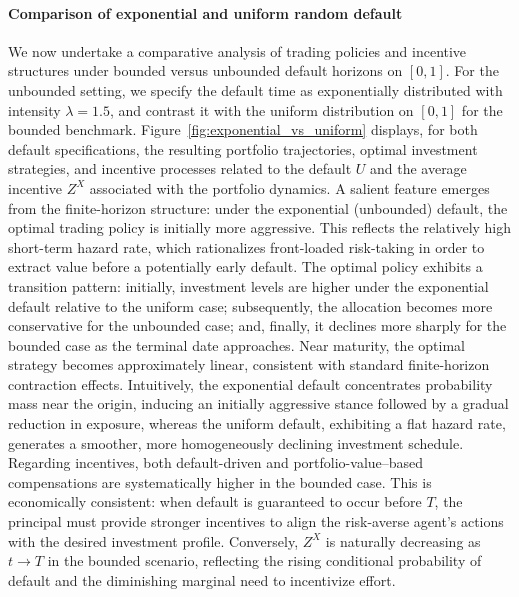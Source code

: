 \documentclass[11pt,a4paper]{article}
\theoremstyle{thmstyleone}%
\theoremstyle{thmstyletwo}%
\theoremstyle{thmstylethree}%
\begin{document}
\paragraph{Comparison of exponential and uniform random default} We now undertake a comparative analysis of trading policies and incentive structures under bounded versus unbounded default horizons on $[0,1]$. For the unbounded setting, we specify the default time as exponentially distributed with intensity $\lambda = 1.5$, and contrast it with the uniform distribution on $[0,1]$ for the bounded benchmark. Figure~\ref{fig:exponential_vs_uniform} displays, for both default specifications, the resulting portfolio trajectories, optimal investment strategies, and incentive processes related to the default $U$ and the average incentive $Z^X$ associated with the portfolio dynamics. A salient feature emerges from the finite-horizon structure: under the exponential (unbounded) default, the optimal trading policy is initially more aggressive. This reflects the relatively high short-term hazard rate, which rationalizes front-loaded risk-taking in order to extract value before a potentially early default.
The optimal policy exhibits a transition pattern: initially, investment levels are higher under the exponential default relative to the uniform case; subsequently, the allocation becomes more conservative for the unbounded case; and, finally, it declines more sharply for the bounded case as the terminal date approaches.
Near maturity, the optimal strategy becomes approximately linear, consistent with standard finite-horizon contraction effects. Intuitively, the exponential default concentrates probability mass near the origin, inducing an initially aggressive stance followed by a gradual reduction in exposure, whereas the uniform default, exhibiting a flat hazard rate, generates a smoother, more homogeneously declining investment schedule.
Regarding incentives, both default-driven and portfolio-value–based compensations are systematically higher in the bounded case. This is economically consistent: when default is guaranteed to occur before $T$, the principal must provide stronger incentives to align the risk-averse agent’s actions with the desired investment profile. Conversely, $Z^X$ is naturally decreasing as $t \to T$ in the bounded scenario, reflecting the rising conditional probability of default and the diminishing marginal need to incentivize effort.
\end{document}
